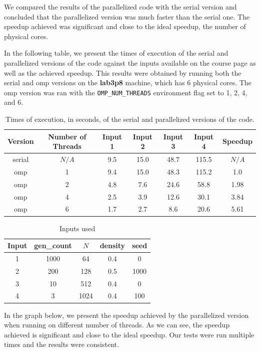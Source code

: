 \documentclass{article}
\begin{document}
We compared the results of the parallelized code with the serial version and 
concluded that the parallelized version was much faster than the serial one. 
The speedup achieved was significant and close to the ideal speedup, the number of 
physical cores.

In the following table, we present the times of execution of the serial and parallelized 
versions of the code against the inputs available on the course page as well as the achieved 
speedup. This results were obtained by running both the serial and omp versions on the 
\textbf{lab3p8} machine, which has 6 physical cores. The omp version was ran with the 
\texttt{OMP\_NUM\_THREADS} environment flag set to 1, 2, 4, and 6.

\begin{table}[h!]
	\centering
	\begin{tabular}{||c c c c c c c||} 
	 \hline
	 Version & Number of Threads & Input 1 & Input 2 & Input 3 & Input 4 & Speedup\\ [0.5ex] 
	 \hline\hline
	 serial & $N/A$ & 9.5 & 15.0 & 48.7 & 115.5 & $N/A$ \\ 
	 omp & 1 & 9.4 & 15.0 & 48.3 & 115.2 & 1.0 \\ 
	 omp & 2 & 4.8 & 7.6 & 24.6 & 58.8 & 1.98 \\
	 omp & 4 & 2.5 & 3.9 & 12.6 & 30.1 & 3.84 \\
	 omp & 6 & 1.7 & 2.7 & 8.6 & 20.6 & 5.61 \\ [1ex] 
	 \hline
	\end{tabular}
	\caption{Times of execution, in seconds, of the serial and parallelized versions of the code.}
	\label{table:1}
\end{table}

\begin{table}[h!]
	\centering
	\begin{tabular}{||c c c c c||} 
	 \hline
	 Input & gen\_count & $N$ & density & seed  \\ [0.5ex] 
	 \hline\hline
	 1 & 1000 & 64 & 0.4 & 0 \\ 
	 2 & 200 & 128 & 0.5 & 1000 \\
	 3 & 10 & 512 & 0.4 & 0 \\ 
	 4 & 3 & 1024 & 0.4 & 100 \\ [1ex] 
	 \hline
	\end{tabular}
	\caption{Inputs used}
	\label{table:2}
\end{table}

In the graph below, we present the speedup achieved by the parallelized version 
when running on different number of threads. As we can see, the speedup achieved 
is significant and close to the ideal speedup. Our tests were run multiple times 
and the results were consistent.
\end{document}
